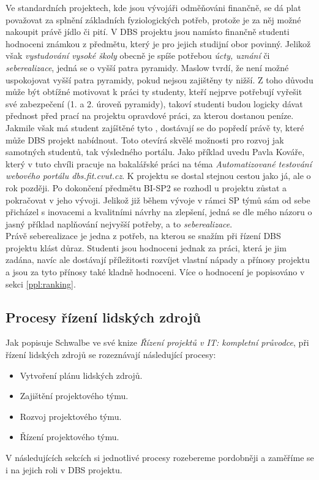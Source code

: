 Ve standardních projektech, kde jsou vývojáři odměňováni finančně, se dá plat považovat za splnění základních fyziologických potřeb, protože je za něj možné nakoupit právě jídlo či pití. V DBS projektu jsou namísto finančně studenti hodnoceni známkou z předmětu, který je pro jejich studijní obor povinný. Jelikož však \emph{vystudování vysoké školy} obecně je spíše potřebou \emph{úcty, uznání} či \emph{seberealizace}, jedná se o vyšší patra pyramidy. Maslow tvrdí, že není možné uspokojovat vyšší patra pyramidy, pokud nejsou zajištěny ty nižší. Z toho důvodu může být obtížné motivovat k práci ty studenty, kteří nejprve potřebují vyřešit své zabezpečení (1. a 2. úroveň pyramidy), takoví studenti budou logicky dávat přednost před prací na projektu opravdové práci, za kterou dostanou peníze. Jakmile však má student zajíštěné tyto , dostávají se do popředí právě ty, které může DBS projekt nabídnout. Toto otevírá skvělé možnosti pro rozvoj jak samotných studentů, tak výsledného portálu. Jako příklad uvedu Pavla Kováře, který v tuto chvíli pracuje na bakalářské práci na téma \emph{Automatizované testování webového portálu dbs.fit.cvut.cz}. K projektu se dostal stejnou cestou jako já, ale o rok později. Po dokončení předmětu BI-SP2 se rozhodl u projektu zůstat a pokračovat v jeho vývoji. Jelikož již během vývoje v rámci SP týmů sám od sebe přicházel s inovacemi a kvalitními návrhy na zlepšení, jedná se dle mého názoru o jasný příklad naplňování nejvyšší potřeby, a to \emph{seberealizace}.\\
Právě seberealizace je jedna z potřeb, na kterou se snažím při řízení DBS projektu klást důraz. Studenti jsou hodnoceni jednak za práci, která je jim zadána, navíc ale dostávají příležitosti rozvíjet vlastní nápady a přínosy projektu a jsou za tyto přínosy také kladně hodnoceni. Více o hodnocení je popisováno v sekci \ref{ppl:ranking}.

\subsection{Procesy řízení lidských zdrojů}

Jak popisuje Schwalbe \cite{schwalbe} ve své knize \emph{Řízení projektů v IT: kompletní průvodce}, při řízení lidských zdrojů se rozeznávají následující procesy:
\begin{itemize}
	\item Vytvoření plánu lidských zdrojů.
	\item Zajištění projektového týmu.
	\item Rozvoj projektového týmu.
	\item Řízení projektového týmu.
\end{itemize}
V následujících sekcích si jednotlivé procesy rozebereme pordobněji a zaměříme se i na jejich roli v DBS projektu.

